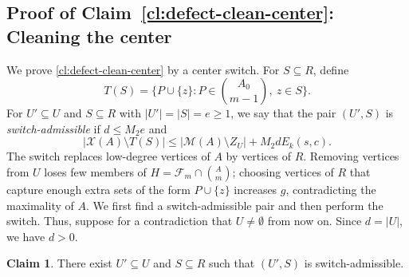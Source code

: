 \documentclass[10pt,a4paper]{article}
\numberwithin{equation}{section}
\theoremstyle{definition}
\newtheorem{claim}[claim]{Claim}
\newcommand{\F}{\mathcal F}
\newcommand{\X}{\mathcal X}
\newcommand{\M}{\mathcal M}
\begin{document}
\subsection{Proof of Claim~\ref{cl:defect-clean-center}: Cleaning the center}

We prove \cref{cl:defect-clean-center} by a center switch.
For $S\subseteq R$, define
\[
        T(S)=\{P\cup\{z\}:P\in\binom{A_0}{m-1},\ z\in S\}.
\]
For $U'\subseteq U$ and $S\subseteq R$ with
$|U'|=|S|=e\ge1$, we say that the pair $(U',S)$ is
\emph{switch-admissible} if $d\le M_2e$ and
\begin{equation}\label{eq:defect-switch-admissible}
        |\X(A)\setminus T(S)|
        \le
        |\M(A)\setminus Z_U|+M_2dE_k(s,c).
\end{equation}
The switch replaces low-degree vertices of $A$ by vertices of $R$.
Removing vertices from $U$ loses few members of $H=\F_m\cap\binom Am$;
choosing vertices of $R$ that capture enough extra sets of the form
$P\cup\{z\}$ increases $g$, contradicting the maximality of $A$.
We first find a switch-admissible pair and then perform the switch.
Thus, suppose for a contradiction that $U\ne\emptyset$ from now on.
Since $d=|U|$, we have $d>0$.

\begin{claim}\label{cl:defect-switch-admissible-exists}
        There exist $U'\subseteq U$ and
        $S\subseteq R$ such that $(U',S)$ is switch-admissible.
\end{claim}
\end{document}
